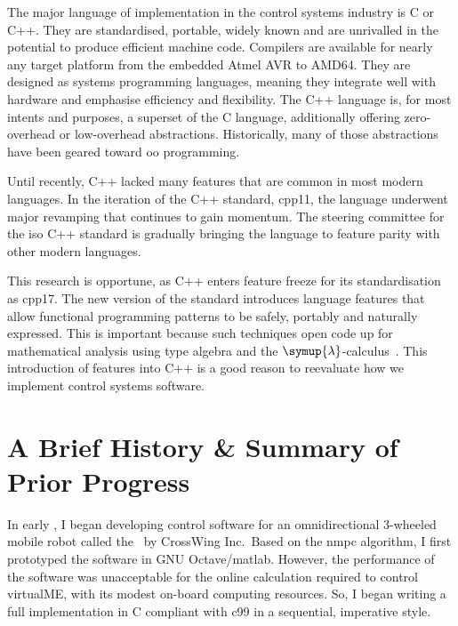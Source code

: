  The major language of implementation in the
control systems industry is C or C++. They are standardised, portable, widely
known and are unrivalled in the potential to produce efficient machine code.
Compilers are available for nearly any target platform from the embedded Atmel
AVR to AMD64. They are designed as systems programming languages, meaning they
integrate well with hardware and emphasise efficiency and flexibility. The C++
language is, for most intents and purposes, a superset of the C language,
additionally offering zero-overhead or low-overhead abstractions. Historically,
many of those abstractions have been geared toward \ac{oo} programming.

Until recently, C++ lacked many features that are common in most modern
languages. In the  iteration of the C++ standard, \ac{cpp11}, the
language underwent major revamping that continues to gain momentum. The steering
committee for the \ac{iso} C++ standard is gradually bringing the language to
feature parity with other modern languages.

This research is opportune, as C++ enters feature freeze for its 
standardisation as \ac{cpp17}. The new version of the standard introduces
language features that allow functional programming patterns to be safely,
portably and naturally expressed. This is important because such techniques open
code up for mathematical analysis using type algebra and the 
$\symup{\lambda}$-calculus~\cite{Church1941}. This
introduction of features into C++ is a good reason to reevaluate how we
implement control systems software.



\section{A Brief History \& Summary of Prior Progress}%
\label{sec:historyANDprogress}


In early , I began developing control software for an omnidirectional
3-wheeled mobile robot called the \virtualmeR\ by CrossWing Inc.\ Based on the
\ac{nmpc} algorithm, I first prototyped the software in GNU Octave/\acs{matlab}.
However, the performance of the software was unacceptable for the online
calculation required to control virtualME, with its modest on-board computing
resources. So, I began writing a full implementation in C compliant with
\acf{c99} in a sequential, imperative style.

